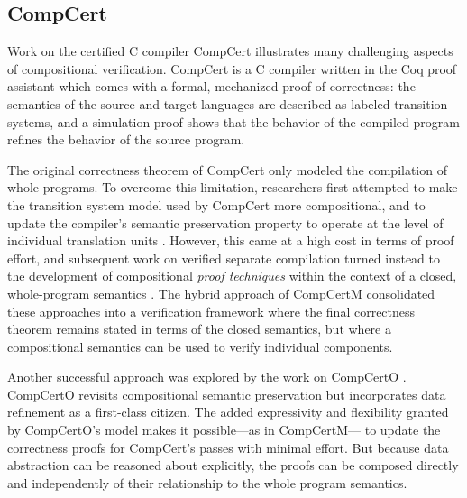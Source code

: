 \documentclass[acmsmall,screen,review,anonymous]{acmart}
\begin{document}


\subsection{CompCert} %

Work on
the certified C compiler CompCert \cite{compcert}
illustrates many challenging aspects of compositional verification.
CompCert is a C compiler written in the Coq proof assistant
which comes with a formal, mechanized proof of correctness:
the semantics of the source and target languages
are described as labeled transition systems,
and a simulation proof
shows that the behavior of the compiled program
refines the behavior of the source program.

The original correctness theorem of CompCert
only modeled the compilation of whole programs.
To overcome this limitation,
researchers first attempted to make
the transition system model used by CompCert
more compositional,
and to update the compiler's semantic preservation property
to operate at the level of individual translation units
\cite{compcompcert}.
However,
this came at a high cost in terms of proof effort,
and subsequent work on verified separate compilation
turned instead to the development of compositional
\emph{proof techniques}
within the context of a closed, whole-program semantics
\cite{sepcompcert}.
The hybrid approach of CompCertM
\cite{compcertm}
consolidated these approaches
into a verification framework
where the final correctness theorem
remains stated in terms of the closed semantics,
but where a compositional semantics
can be used to verify individual components.

Another successful approach
was explored by the work on CompCertO \cite{compcerto}.
CompCertO revisits compositional semantic preservation
but incorporates data refinement
as a first-class citizen.
The added expressivity and flexibility
granted by CompCertO's model
makes it possible---as in CompCertM---%
to update the correctness proofs for CompCert's passes
with minimal effort.
But because data abstraction can be reasoned about explicitly,
the proofs can be composed directly and independently
of their relationship to the whole program semantics.
\end{document}
